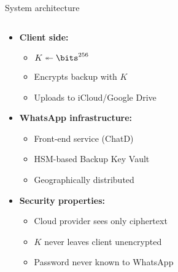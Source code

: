 \documentclass[aspectratio=169, lualatex, handout]{beamer}
\begin{document}
\begin{frame}{System architecture}
	\begin{columns}[c]
		\begin{column}{0.6\textwidth}
			\begin{itemize}
				\item \textbf{Client side:}
				      \begin{itemize}
					      \item $K \twoheadleftarrow \bits^{256}$
					      \item Encrypts backup with $K$
					      \item Uploads to iCloud/Google Drive
				      \end{itemize}
				\item \textbf{WhatsApp infrastructure:}
				      \begin{itemize}
					      \item Front-end service (ChatD)
					      \item HSM-based Backup Key Vault
					      \item Geographically distributed
				      \end{itemize}
				\item \textbf{Security properties:}
				      \begin{itemize}
					      \item Cloud provider sees only ciphertext
					      \item $K$ never leaves client unencrypted
					      \item Password never known to WhatsApp
				      \end{itemize}
			\end{itemize}
		\end{column}
		\begin{column}{0.4\textwidth}
		\end{column}
	\end{columns}
\end{frame}
\end{document}

